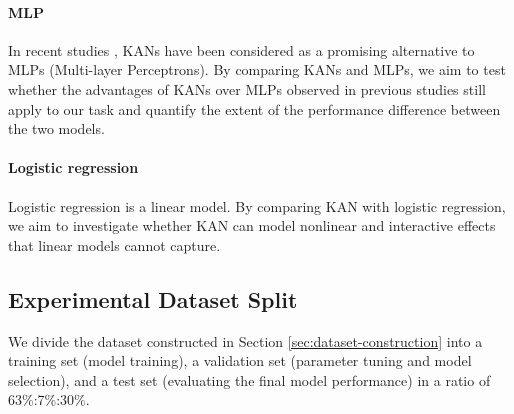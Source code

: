 \documentclass{article}
\begin{document}
\paragraph{MLP}
In recent studies \parencite{liu2024kankolmogorovarnoldnetworks}, KANs have been considered as a promising alternative to MLPs (Multi-layer Perceptrons). By comparing KANs and MLPs, we aim to test whether the advantages of KANs over MLPs observed in previous studies still apply to our task and quantify the extent of the performance difference between the two models.

\paragraph{Logistic regression}
Logistic regression is a linear model. By comparing KAN with logistic regression, we aim to investigate whether KAN can model nonlinear and interactive effects that linear models cannot capture.



\subsection{Experimental Dataset Split }

We divide the dataset constructed in Section \ref{sec:dataset-construction} into a training set (model training), a validation set (parameter tuning and model selection), and a test set (evaluating the final model performance) in a ratio of 63\%:7\%:30\%. 
\end{document}
